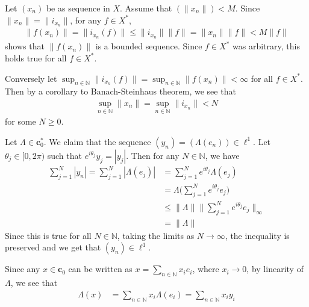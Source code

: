 \documentclass[12pt]{exam}
\theoremstyle{plain} %
\theoremstyle{definition} %
\theoremstyle{remark} %
\begin{document}
\begin{questions}
  \question
  \begin{solution}
    Let $(x_n)$ be as sequence in $X$.
    Assume that $(\|x_n\|) < M$. Since $\|x_n\|
    = \|i_{x_n}\|$, for any $f \in X^*$,
    \begin{align*}
      \|f(x_n)\| = \|i_{x_n}(f)\| \le \|i_{x_n}\|\|f\| =
      \|x_n\|\|f\| < M \|f\|
    \end{align*}
    shows that $\|f(x_n)\|$ is a bounded sequence. Since $f \in X^*$
    was arbitrary, this holds true for all $f \in X^*$.

    Conversely let $\sup_{n \in \mathbb{N}}\|i_{x_n}(f)\| = \sup_{n
    \in \mathbb{N}}\|f(x_n)\| < \infty$ for all
    $f \in X^*$. Then by a corollary to Banach-Steinhaus
    theorem, we see that
    \begin{align*}
      \sup_{  n \in \mathbb{N}} \|x_n\| = \sup_{n \in \mathbb{N}}
      \|i_{x_n}\| < N
    \end{align*}
    for some $N \ge 0$.
  \end{solution}

  \question
  \begin{solution}
    Let $\Lambda \in
    \textbf{c}_0^{*}$. We claim that the sequence $(y_n) =
    (\Lambda(e_n)) \in \ell^1$. Let
    $\theta_j \in [0, 2\pi)$ such that $e^{ i \theta_j}y_j =
    |y_j|$. Then for any $N \in \mathbb{N}$, we have
    \begin{align*}
      \sum_{j = 1}^{N} |y_n| = \sum_{j = 1}^{N} |\Lambda(e_j)| &=
      \sum_{j = 1}^{N} e^{i \theta_j} \Lambda(e_j) \\
      &= \Lambda\Big(\sum_{j = 1}^{N} e^{i \theta_j} e_j \Big) \\
      &\le \| \Lambda\| \Big \| \sum_{j = 1}^{N} e^{i \theta_j} e_j
      \Big \|_\infty \\
      &= \| \Lambda\|
    \end{align*}
    Since this is true for all $N \in \mathbb{N}$, taking the
    limits as $N \to \infty$, the inequality is preserved and we
    get that $(y_n) \in \ell^1$.

    Since any $x \in \textbf{c}_0$ can be written as $x = \sum_{n \in
    \mathbb{N}} x_i e_i$, where $x_i \to 0$, by linearity of
    $\Lambda$, we see that
    \begin{align*}
      \Lambda(x) &= \sum_{n \in \mathbb{N}} x_i \Lambda(e_i) =
      \sum_{n \in \mathbb{N}}  x_i y_i
    \end{align*}
  \end{solution}

\end{questions}
\printbibliography[heading=bibintoc]
\end{document}
